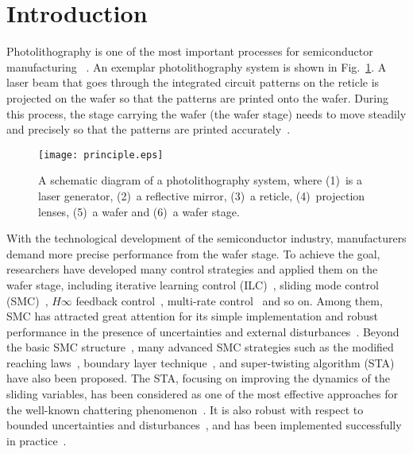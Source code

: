 \documentclass{ifacconf}
\begin{document}
\section{Introduction}
Photolithography is one of the most important processes for semiconductor manufacturing ~\citep{mishra2009projephotoction}. An exemplar photolithography system is shown in Fig.~\ref{fig:wafer_scanner}. A laser beam that goes through the integrated circuit patterns on the reticle is projected on the wafer so that the patterns are printed onto the wafer. During this process, the stage carrying the wafer (the wafer stage) needs to move steadily and precisely so that the patterns are printed accurately~\citep{oomen2013connecting}. 
\begin{figure}[http]
  \centering
   \texttt{[image: principle.eps]}%
   \caption{A schematic diagram of a photolithography system, where (1)~is a laser generator, (2)~a reflective mirror, (3)~a reticle, (4)~projection lenses, (5)~a wafer and (6)~a wafer stage.}
   \label{fig:wafer_scanner}
   \end{figure}
   
With the technological development of the semiconductor industry, manufacturers demand more precise performance from the wafer stage. To achieve the goal, researchers have developed many control strategies and applied them on the wafer stage, including iterative learning control (ILC)~\citep{heertjes2007robustness, mishra2009projection, sun2014selective, zheng2017design}, sliding mode control (SMC)~\citep{heertjes2014self, li2016state, wu2011sliding, ito2014sliding}, $H \infty$ feedback control~\citep{van2002multivariable}, multi-rate control~\citep{sun2016multirate} and so on. Among them, SMC has attracted great attention for its simple implementation and robust performance in the presence of uncertainties and external disturbances~\citep{fukushima2014sliding,kuang2019precise}.
Beyond the basic SMC structure~\citep{edwards1998sliding}, many advanced SMC strategies such as the modified reaching laws~\citep{yu2005continuous}, boundary layer technique~\citep{chen2002state}, and super-twisting algorithm (STA)~\citep{moreno2012strict} have also been proposed. The STA, focusing on improving the dynamics of the sliding variables, has been considered as one of the most effective approaches for the well-known chattering phenomenon~\citep{sun2018practical}. It is also robust with respect to bounded uncertainties and disturbances~\citep{shtessel2012novel,kuang2018contouring}, and has been implemented successfully in practice~\citep{shtessel2012novel,sadeghi2018super}.
\end{document}
